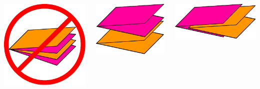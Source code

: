 \documentclass{beamer}
\begin{document}
\begin{frame}
\begin{columns}[c]
\includegraphics[width=.7\textwidth]{sam_images/bad-butterfly.pdf}

\includegraphics[width=.8\textwidth]{sam_images/butterfly-stack.pdf}

\bigskip
\includegraphics[width=.8\textwidth]{sam_images/butterfly-nest.pdf}


\end{columns}

\end{frame}
\end{document}
